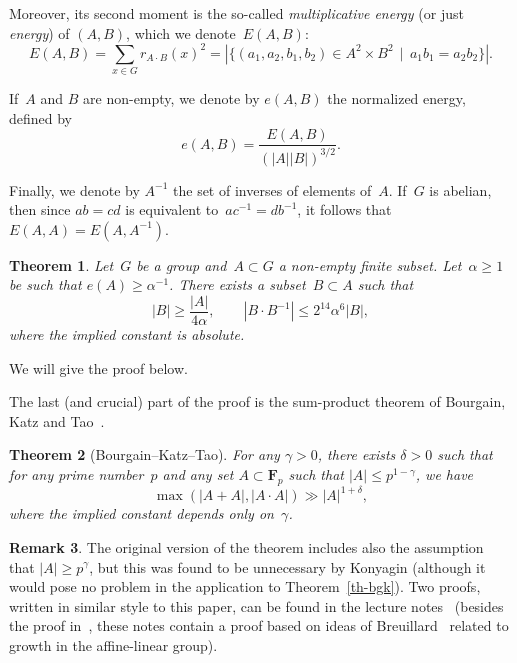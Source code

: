 \documentclass[12pt]{amsart}
\renewcommand{\leq}{\leqslant}
\renewcommand{\geq}{\geqslant}
\numberwithin{equation}{section}
\newcommand{\Ff}{\mathbf{F}}
\theoremstyle{plain}
\newtheorem{theorem}{Theorem}[section]
\theoremstyle{remark}
\theoremstyle{definition}
\newtheorem{remark}[theorem]{Remark}
\renewcommand{\geq}{\geqslant}
\renewcommand{\leq}{\leqslant}
\begin{document}
Moreover, its second moment is the so-called \emph{multiplicative
  energy} (or just \emph{energy}) of $(A,B)$, which we denote~$E(A,B)$:
$$
E(A,B)=\sum_{x\in G}r_{A\cdot B}(x)^2=|\{(a_1,a_2,b_1,b_2)\in A^2\times
B^2\,\mid\, a_1b_1=a_2b_2\}|.
$$

If~$A$ and $B$ are non-empty, we denote by $e(A,B)$ the normalized
energy, defined by
$$
e(A,B)=\frac{E(A,B)}{(|A||B|)^{3/2}}.
$$

Finally, we denote by $A^{-1}$ the set of inverses of elements
of~$A$. If~$G$ is abelian, then since $ab=cd$ is equivalent
to~$ac^{-1}=db^{-1}$, it follows that $E(A,A)=E(A,A^{-1})$.


\begin{theorem}\label{th-schoen}
  Let~$G$ be a group and~$A\subset G$ a non-empty finite
  subset. Let~$\alpha\geq 1$ be such that $e(A)\geq \alpha^{-1}$. There
  exists a subset~$B\subset A$ such that
  \begin{equation}\label{eq-bgs-1}
    |B|\geq \frac{|A|}{4\alpha},\quad\quad
    |B\cdot B^{-1}|\leq
    2^{14}\alpha^6|B|,
  \end{equation}
  where the implied constant is absolute.
\end{theorem}

We will give the proof below.

The last (and crucial) part of the proof is the sum-product theorem of
Bourgain, Katz and Tao~\cite{bkt}. 

\begin{theorem}[Bourgain--Katz--Tao]\label{th-sum-product}
  For any $\gamma>0$, there exists $\delta>0$ such that for any prime
  number~$p$ and any set $A\subset \Ff_p$ such that
  $|A|\leq p^{1-\gamma}$, we have
  \begin{equation}\label{eq-sum-product-fp}
    \max(|A+A|,|A\cdot A|)\gg |A|^{1+\delta},
  \end{equation}
  where the implied constant depends only on~$\gamma$.
\end{theorem}

\begin{remark}
  The original version of the theorem includes also the assumption that
  $|A|\geq p^{\gamma}$, but this was found to be unnecessary by Konyagin
  (although it would pose no problem in the application to
  Theorem~\ref{th-bgk}). Two proofs, written in similar style to this
  paper, can be found in the lecture notes~\cite[\S\,4.2]{add-comb}
  (besides the proof in~\cite{bkt}, these notes contain a proof based on
  ideas of Breuillard~\cite{breuillard} related to growth in the
  affine-linear group).
\end{remark}
\end{document}
